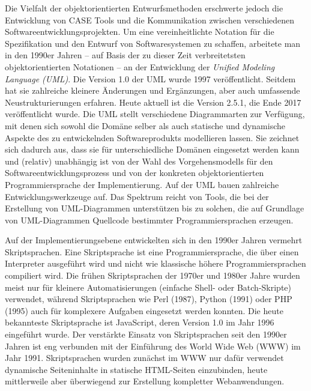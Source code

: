 Die Vielfalt der objektorientierten Entwurfsmethoden erschwerte jedoch die Entwicklung von CASE Tools und die Kommunikation zwischen verschiedenen Softwareentwicklungsprojekten. Um eine vereinheitlichte Notation für die Spezifikation und den Entwurf von Softwaresystemen zu schaffen, arbeitete man in den 1990er Jahren – auf Basis der zu dieser Zeit verbreitetsten objektorientierten Notationen – an der Entwicklung der \textit{Unified Modeling Language (UML)}.
Die Version 1.0 der UML wurde 1997 veröffentlicht. Seitdem hat sie zahlreiche kleinere Änderungen und Ergänzungen, aber auch umfassende Neustrukturierungen erfahren. Heute aktuell ist die Version 2.5.1, die Ende 2017 veröffentlicht wurde. Die UML stellt verschiedene Diagrammarten zur Verfügung, mit denen sich sowohl die Domäne selber als auch statische und dynamische Aspekte des zu entwickelnden Softwareprodukts modellieren lassen. Sie zeichnet sich dadurch aus, dass sie für unterschiedliche Domänen eingesetzt werden kann und (relativ) unabhängig ist von der Wahl des Vorgehensmodells für den Softwareentwicklungsprozess und von der konkreten objektorientierten Programmiersprache der Implementierung. Auf der UML bauen zahlreiche Entwicklungswerkzeuge auf. Das Spektrum reicht von Tools, die bei der Erstellung von UML-Diagrammen unterstützen bis zu solchen, die auf Grundlage von UML-Diagrammen Quellcode bestimmter Programmiersprachen erzeugen.


Auf der Implementierungsebene entwickelten sich in den 1990er Jahren vermehrt Skriptsprachen. 
Eine Skriptsprache ist eine Programmiersprache, die über einen Interpreter ausgeführt wird und nicht wie klassische höhere Programmiersprachen compiliert wird. Die frühen Skriptsprachen der 1970er und 1980er Jahre wurden meist nur für kleinere Automatisierungen (\zb einfache Shell- oder Batch-Skripte) verwendet, während Skriptsprachen wie Perl (1987), Python (1991) oder PHP (1995) auch für komplexere Aufgaben eingesetzt werden konnten. Die heute bekannteste Skriptsprache ist JavaScript, deren Version 1.0 im Jahr 1996 eingeführt wurde. Der verstärkte Einsatz von Skriptsprachen seit den 1990er Jahren ist eng verbunden mit der Einführung des World Wide Web (WWW) im Jahr 1991. Skriptsprachen wurden zunächst im WWW nur dafür verwendet dynamische Seiteninhalte in statische HTML-Seiten einzubinden, heute mittlerweile aber überwiegend zur Erstellung kompletter Webanwendungen. 

